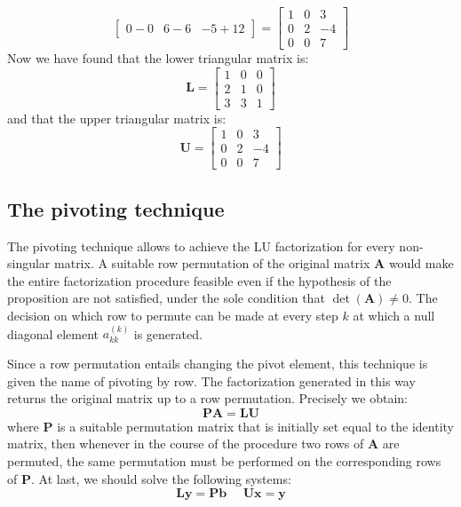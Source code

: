 \documentclass[12pt, a4paper]{report}
\newtheorem[style=M,bodystyle=\normalfont]{theorem}{Theorem}
\newtheorem[style=M,bodystyle=\normalfont]{proposition}{Proposition}
\newtheorem[style=M,bodystyle=\normalfont]{corollary}{Corollary}
\newtheorem[style=M,bodystyle=\normalfont]{lemma}{Lemma}
\newtheorem[style=M,bodystyle=\normalfont]{definition}{Definition}
\begin{document}
\begin{example}
\[\begin{bmatrix}
            0-0 & 6-6 & -5+12
        \end{bmatrix}=
        \begin{bmatrix}
            1 & 0 & 3 \\
            0 & 2 & -4 \\
            0 & 0 & 7
        \end{bmatrix}\]
        Now we have found that the lower triangular matrix is: 
        \[\boldsymbol{L}=
        \begin{bmatrix}
            1 & 0 & 0 \\
            2 & 1 & 0 \\
            3 & 3 & 1
        \end{bmatrix}\]
        and that the upper triangular matrix is: 
        \[\boldsymbol{U}=
        \begin{bmatrix}
            1 & 0 & 3 \\
            0 & 2 & -4 \\
            0 & 0 & 7
        \end{bmatrix}\]
    \end{example}

    \subsection{The pivoting technique}
    The pivoting technique allows to achieve the LU factorization for every non-singular matrix. A suitable row permutation of the 
    original matrix $\boldsymbol{A}$ would make the entire factorization procedure feasible even if the hypothesis of the proposition
    are not satisfied, under the sole condition that $\det(\boldsymbol{A}) \neq 0$. The decision on which row to permute can be made 
    at every step $k$ at which a null diagonal element $a_{kk}^{(k)}$ is generated. 

    Since a row permutation entails changing the pivot element, this technique is given the name of pivoting by row. The factorization 
    generated in this way returns the original matrix up to a row permutation. Precisely we obtain: 
    \[\boldsymbol{PA}=\boldsymbol{LU}\]
    where $\boldsymbol{P}$ is a suitable permutation matrix that is initially set equal to the identity matrix, then whenever in the 
    course of the procedure two rows of $\boldsymbol{A}$ are permuted, the same permutation must be performed on the corresponding rows
    of $\boldsymbol{P}$. At last, we should solve the following systems: 
    \[\boldsymbol{Ly}=\boldsymbol{Pb} \:\:\:\:\:\: \boldsymbol{Ux}=\boldsymbol{y}\]
\end{document}
